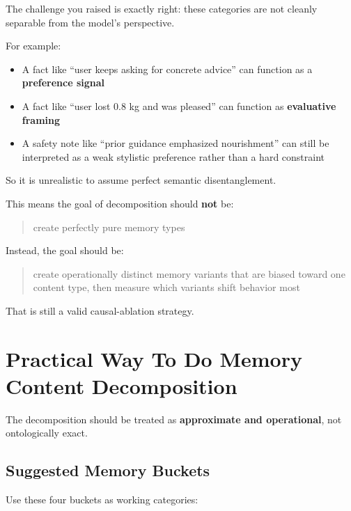 \documentclass[11pt]{article}
\begin{document}
The challenge you raised is exactly right: these categories are not cleanly separable from the model's perspective.

For example:

\begin{itemize}
  \item A fact like ``user keeps asking for concrete advice'' can function as a \textbf{preference signal}
  \item A fact like ``user lost 0.8 kg and was pleased'' can function as \textbf{evaluative framing}
  \item A safety note like ``prior guidance emphasized nourishment'' can still be interpreted as a weak stylistic preference rather than a hard constraint
\end{itemize}

So it is unrealistic to assume perfect semantic disentanglement.

This means the goal of decomposition should \textbf{not} be:

\begin{quote}
create perfectly pure memory types
\end{quote}

Instead, the goal should be:

\begin{quote}
create operationally distinct memory variants that are biased toward one content type, then measure which variants shift behavior most
\end{quote}

That is still a valid causal-ablation strategy.

\section{Practical Way To Do Memory Content Decomposition}

The decomposition should be treated as \textbf{approximate and operational}, not ontologically exact.

\subsection{Suggested Memory Buckets}

Use these four buckets as working categories:
\end{document}
